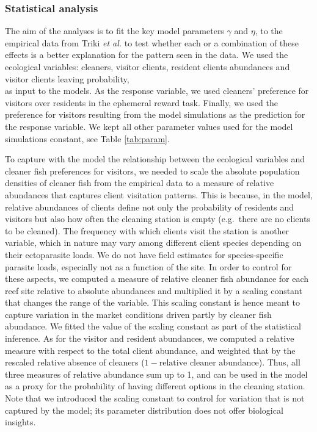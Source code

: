 \documentclass[]{rsos}%
\begin{document}
\hypertarget{statistical-analysis}{%
\subsubsection{Statistical analysis}\label{statistical-analysis}}

The aim of the analyses is to fit the key model parameters
\(\gamma\) and \(\eta\), to the empirical data from Triki \emph{et al.}
\citep{triki_Biological_2019, triki_Brain_2020} to test whether each or
a combination of these effects is a better explanation for the pattern
seen in the data. We used the ecological variables: cleaners, visitor clients,
resident clients abundances and visitor clients leaving probability,\\
as input to the models. As the response variable, we used cleaners'
preference for visitors over residents in the ephemeral reward task.
Finally, we used the preference for visitors resulting from the
model simulations as the prediction for the response variable.
We kept all other parameter values used for the model simulations constant,
see Table \ref{tab:param}.

To capture with the model the relationship between the ecological
variables and cleaner fish preferences for visitors, we needed to scale
the absolute population densities of cleaner fish from the empirical data
to a measure of relative abundances that captures client visitation patterns.
This is because, in the model, relative abundances of clients
define not only the probability of residents and visitors
but also how often the cleaning station is empty (e.g.~there are no
clients to be cleaned). The frequency with which clients visit the station
is another variable, which in nature may vary among different client species
depending on their ectoparasite loads. We do not have field estimates
for species-specific parasite loads, especially not as a function of the site.
In order to control for these aspects, we computed a measure of relative
cleaner fish abundance for each reef site relative to
absolute abundances and multiplied it
by a scaling constant that changes the range of the variable. This scaling
constant is hence meant to capture variation in the market conditions driven
partly by cleaner fish abundance. We fitted the value of the scaling constant as
part of the statistical inference. As for the visitor and resident
abundances, we computed a relative measure with respect to the
total client abundance, and weighted that by the rescaled relative absence
of cleaners (\(1-\text{relative cleaner abundance}\)). Thus, all three measures
of relative abundance sum up to 1, and can be used in the model as a proxy
for the probability of having different options in the cleaning station.
Note that we introduced the scaling constant to control for variation that
is not captured by the model; its parameter distribution does not offer
biological insights.
\end{document}
